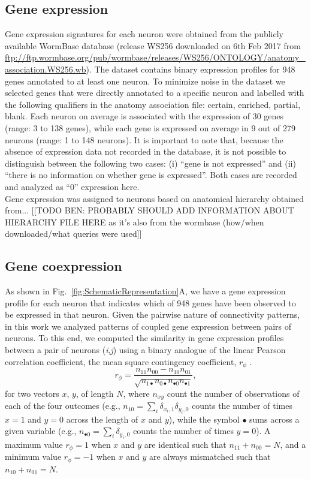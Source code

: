 \documentclass[10pt,letterpaper]{article}
\begin{document}
\subsection*{Gene expression}
Gene expression signatures for each neuron were obtained from the publicly available WormBase database (release WS256 downloaded on 6th Feb 2017 from \url{ftp://ftp.wormbase.org/pub/wormbase/releases/WS256/ONTOLOGY/anatomy_association.WS256.wb}).
The dataset contains binary expression profiles for 948 genes annotated to at least one neuron.
To minimize noise in the dataset we selected genes that were directly annotated to a specific neuron and labelled with the following qualifiers in the anatomy association file: certain, enriched, partial, blank.
Each neuron on average is associated with the expression of 30 genes (range: 3 to 138 genes), while each gene is expressed on average in 9 out of 279 neurons (range: 1 to 148 neurons).
It is important to note that, because the absence of expression data not recorded in the database, it is not possible to distinguish between the following two cases: (i) ``gene is not expressed'' and (ii) ``there is no information on whether gene is expressed''.
Both cases are recorded and analyzed as ``0'' expression here.\\

Gene expression was assigned to neurons based on anatomical hierarchy obtained from...
[[TODO BEN: PROBABLY SHOULD ADD INFORMATION ABOUT HIERARCHY FILE HERE as it's also from the wormbase (how/when downloaded/what queries were used]]

\subsection*{Gene coexpression}
As shown in Fig.~\ref{fig:SchematicRepresentation}A, we have a gene expression profile for each neuron that indicates which of 948 genes have been observed to be expressed in that neuron.
Given the pairwise nature of connectivity patterns, in this work we analyzed patterns of coupled gene expression between pairs of neurons.
To this end, we computed the similarity in gene expression profiles between a pair of neurons (\textit{i},\textit{j}) using a binary analogue of the linear Pearson correlation coefficient, the mean square contingency coefficient, $r_\phi$ \cite{Warrens2008}. 
\begin{equation}
    r_\phi = \frac{n_{11}n_{00} - n_{10}n_{01}}{\sqrt{n_{1\bullet}n_{0\bullet}n_{\bullet 0}n_{\bullet 1}}},
\end{equation}
for two vectors $x$, $y$, of length $N$, where $n_{xy}$ count the number of observations of each of the four outcomes (e.g., $n_{10} = \sum_i \delta_{x_i,1}\delta_{y_i,0}$ counts the number of times $x=1$ and $y=0$ across the length of $x$ and $y$), while the symbol $\bullet$ sums across a given variable (e.g., $n_{\bullet 0} = \sum_i \delta_{y_i,0}$ counts the number of times $y = 0$).
A maximum value $r_\phi = 1$ when $x$ and $y$ are identical such that $n_{11} + n_{00} = N$, and a minimum value $r_\phi = -1$ when $x$ and $y$ are always mismatched such that $n_{10} + n_{01} = N$.
\end{document}

